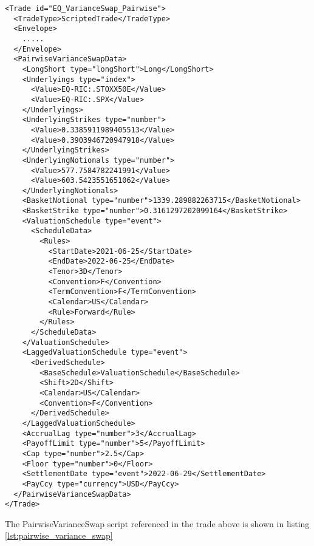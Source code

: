 \begin{verbatim}
<Trade id="EQ_VarianceSwap_Pairwise">
  <TradeType>ScriptedTrade</TradeType>
  <Envelope>
    .....
  </Envelope>
  <PairwiseVarianceSwapData>
    <LongShort type="longShort">Long</LongShort>
    <Underlyings type="index">
      <Value>EQ-RIC:.STOXX50E</Value>
      <Value>EQ-RIC:.SPX</Value>
    </Underlyings>
    <UnderlyingStrikes type="number">
      <Value>0.3385911989405513</Value>
      <Value>0.3903946720947918</Value>
    </UnderlyingStrikes>
    <UnderlyingNotionals type="number">
      <Value>577.7584782241991</Value>
      <Value>603.5423551651062</Value>
    </UnderlyingNotionals>
    <BasketNotional type="number">1339.289882263715</BasketNotional>
    <BasketStrike type="number">0.3161297202099164</BasketStrike>
    <ValuationSchedule type="event">
      <ScheduleData>
        <Rules>
          <StartDate>2021-06-25</StartDate>
          <EndDate>2022-06-25</EndDate>
          <Tenor>3D</Tenor>
          <Convention>F</Convention>
          <TermConvention>F</TermConvention>
          <Calendar>US</Calendar>
          <Rule>Forward</Rule>
        </Rules>
      </ScheduleData>
    </ValuationSchedule>
    <LaggedValuationSchedule type="event">
      <DerivedSchedule>
        <BaseSchedule>ValuationSchedule</BaseSchedule>
        <Shift>2D</Shift>
        <Calendar>US</Calendar>
        <Convention>F</Convention>
      </DerivedSchedule>
    </LaggedValuationSchedule>
    <AccrualLag type="number">3</AccrualLag>
    <PayoffLimit type="number">5</PayoffLimit>
    <Cap type="number">2.5</Cap>
    <Floor type="number">0</Floor>
    <SettlementDate type="event">2022-06-29</SettlementDate>
    <PayCcy type="currency">USD</PayCcy>
  </PairwiseVarianceSwapData>
</Trade>
\end{verbatim}

The PairwiseVarianceSwap script referenced in the trade above is shown in listing
\ref{lst:pairwise_variance_swap}

